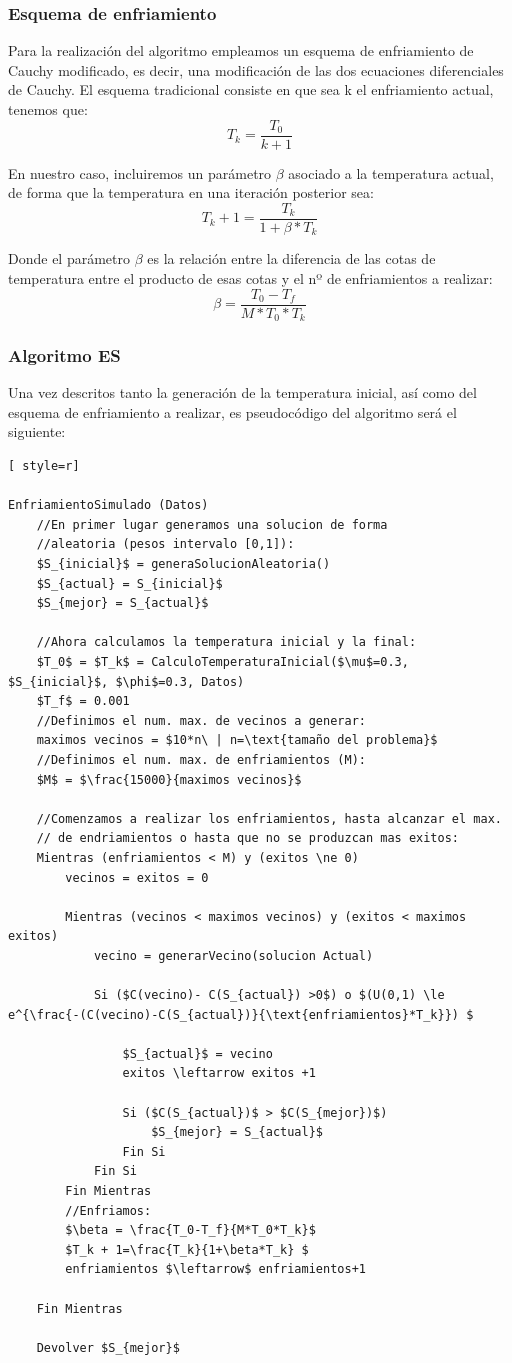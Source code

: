 \subsubsection{Esquema de enfriamiento}
Para la realización del algoritmo empleamos un esquema de enfriamiento de Cauchy modificado, es decir, una modificación de las dos ecuaciones diferenciales de Cauchy. El esquema tradicional consiste en que sea k el enfriamiento actual, tenemos que:
\[
T_k = \frac{T_0}{k+1}
\]

En nuestro caso, incluiremos un parámetro $\beta$ asociado a la temperatura actual, de forma que la temperatura en una iteración posterior sea:
\[
T_k + 1=\frac{T_k}{1+\beta*T_k} 
\]

Donde el parámetro $\beta$ es la relación entre la diferencia de las cotas de temperatura entre el producto de esas cotas y el nº de enfriamientos a realizar:
\[
\beta = \frac{T_0-T_f}{M*T_0*T_k}
\]

\subsubsection{Algoritmo ES}
Una vez descritos tanto la generación de la temperatura inicial, así como del esquema de enfriamiento a realizar, es pseudocódigo del algoritmo será el siguiente:

\begin{lstlisting}[ style=r]

EnfriamientoSimulado (Datos)
	//En primer lugar generamos una solucion de forma
	//aleatoria (pesos intervalo [0,1]):
	$S_{inicial}$ = generaSolucionAleatoria()
	$S_{actual} = S_{inicial}$
	$S_{mejor} = S_{actual}$
	
	//Ahora calculamos la temperatura inicial y la final:
	$T_0$ = $T_k$ = CalculoTemperaturaInicial($\mu$=0.3, $S_{inicial}$, $\phi$=0.3, Datos)
	$T_f$ = 0.001
	//Definimos el num. max. de vecinos a generar:
	maximos vecinos = $10*n\ | n=\text{tamaño del problema}$
	//Definimos el num. max. de enfriamientos (M):
	$M$ = $\frac{15000}{maximos vecinos}$
	
	//Comenzamos a realizar los enfriamientos, hasta alcanzar el max.
	// de endriamientos o hasta que no se produzcan mas exitos:
	Mientras (enfriamientos < M) y (exitos \ne 0)
		vecinos = exitos = 0
		
		Mientras (vecinos < maximos vecinos) y (exitos < maximos exitos)
			vecino = generarVecino(solucion Actual)
			
			Si ($C(vecino)- C(S_{actual}) >0$) o $(U(0,1) \le e^{\frac{-(C(vecino)-C(S_{actual})}{\text{enfriamientos}*T_k}}) $
				
				$S_{actual}$ = vecino
				exitos \leftarrow exitos +1
				
				Si ($C(S_{actual})$ > $C(S_{mejor})$)
					$S_{mejor} = S_{actual}$
				Fin Si
			Fin Si
		Fin Mientras
		//Enfriamos:
		$\beta = \frac{T_0-T_f}{M*T_0*T_k}$
		$T_k + 1=\frac{T_k}{1+\beta*T_k} $
		enfriamientos $\leftarrow$ enfriamientos+1
		
	Fin Mientras
	
	Devolver $S_{mejor}$

\end{lstlisting}



